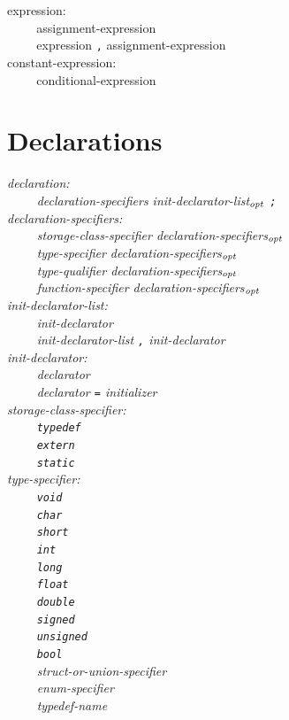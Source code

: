 \documentclass[12pt]{report}
\def\|{\verb|}
\newcommand\opt{$_{{\it opt}}$ }
\begin{document}
\noindent
expression:\\
\|    | assignment-expression\\
\|    | expression \verb+,+ assignment-expression\\

\noindent
constant-expression:\\
\|    | conditional-expression\\

\rm
\section{Declarations}
\it
\noindent
declaration:\\
\|    | declaration-specifiers init-declarator-list\opt \verb+;+\\

\noindent
declaration-specifiers:\\
\|    | storage-class-specifier declaration-specifiers\opt\\
\|    | type-specifier declaration-specifiers\opt\\
\|    | type-qualifier declaration-specifiers\opt\\
\|    | function-specifier declaration-specifiers\opt\\

\noindent
init-declarator-list:\\
\|    | init-declarator\\
\|    | init-declarator-list \verb+,+ init-declarator\\

\noindent
init-declarator:\\
\|    | declarator\\
\|    | declarator \verb+=+ initializer\\

\noindent
storage-class-specifier:\\
\|    | \verb+typedef+\\
\|    | \verb+extern+\\
\|    | \verb+static+\\

\noindent
type-specifier:\\
\|    | \verb+void+\\
\|    | \verb+char+\\
\|    | \verb+short+\\
\|    | \verb+int+\\
\|    | \verb+long+\\
\|    | \verb+float+\\
\|    | \verb+double+\\
\|    | \verb+signed+\\
\|    | \verb+unsigned+\\
\|    | \verb+bool+\\
\|    | struct-or-union-specifier\\
\|    | enum-specifier\\
\|    | typedef-name\\
\end{document}
